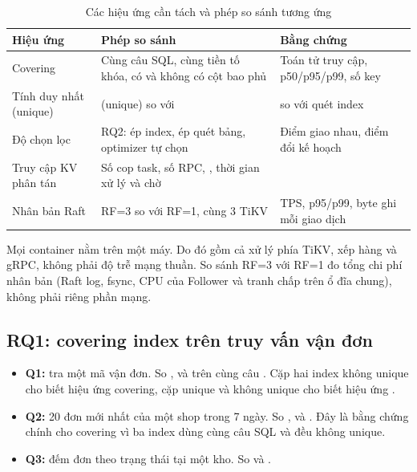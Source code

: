\begin{table}[H]
\centering
\caption{Các hiệu ứng cần tách và phép so sánh tương ứng}
\label{tab:tach_hieu_ung}
\bangfont
\begin{tabularx}{\linewidth}{@{}>{\raggedright\arraybackslash}p{3.6cm}YY@{}}
\toprule
\textbf{Hiệu ứng} & \textbf{Phép so sánh} & \textbf{Bằng chứng}\\
\midrule
Covering & Cùng câu SQL, cùng tiền tố khóa, có và không có cột bao phủ & Toán tử truy cập, p50/p95/p99, số key\\
Tính duy nhất (unique) &  (unique) so với  &  so với quét index\\
Độ chọn lọc & RQ2: ép index, ép quét bảng, optimizer tự chọn & Điểm giao nhau, điểm đổi kế hoạch\\
Truy cập KV phân tán & Số cop task, số RPC, , thời gian xử lý và chờ & \\
Nhân bản Raft & RF=3 so với RF=1, cùng 3 TiKV & TPS, p95/p99, byte ghi mỗi giao dịch\\
\bottomrule
\end{tabularx}
\end{table}

Mọi container nằm trên một máy. Do đó  gồm cả xử lý phía TiKV, xếp hàng và gRPC, không phải độ trễ mạng thuần. So sánh RF=3 với RF=1 đo tổng chi phí nhân bản (Raft log, fsync, CPU của Follower và tranh chấp trên ổ đĩa chung), không phải riêng phần mạng.

\subsection{RQ1: covering index trên truy vấn vận đơn}

\begin{itemize}
  \item \textbf{Q1:} tra một mã vận đơn. So ,  và  trên cùng câu . Cặp hai index không unique cho biết hiệu ứng covering, cặp unique và không unique cho biết hiệu ứng .
  \item \textbf{Q2:} 20 đơn mới nhất của một shop trong 7 ngày. So ,  và . Đây là bằng chứng chính cho covering vì ba index dùng cùng câu SQL và đều không unique.
  \item \textbf{Q3:} đếm đơn theo trạng thái tại một kho. So  và .
\end{itemize}


